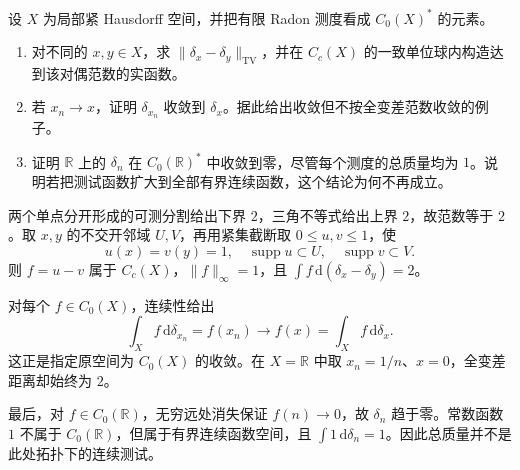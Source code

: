 \begin{exercise}\label{b1:ex:11-dirac-topologies}
设 \(X\) 为局部紧 Hausdorff 空间，并把有限 Radon 测度看成 \(C_0(X)^*\) 的元素。
\begin{enumerate}
\item\label{b1:item:11-dirac-tv}
对不同的 \(x,y\in X\)，求 \(\|\delta_x-\delta_y\|_{\mathrm{TV}}\)，并在 \(C_c(X)\) 的一致单位球内构造达到该对偶范数的实函数。
\item\label{b1:item:11-dirac-limit}
若 \(x_n\rightarrow x\)，证明 \(\delta_{x_n}\) \WeakStar{}收敛到 \(\delta_x\)。据此给出\WeakStar{}收敛但不按全变差范数收敛的例子。
\item\label{b1:item:11-dirac-escape}
证明 \(\mathbb R\) 上的 \(\delta_n\) 在 \(C_0(\mathbb R)^*\) 中\WeakStar{}收敛到零，尽管每个测度的总质量均为 \(1\)。说明若把测试函数扩大到全部有界连续函数，这个结论为何不再成立。
\end{enumerate}
\end{exercise}
\begin{solution}
两个单点分开形成的可测分割给出下界 \(2\)，三角不等式给出上界 \(2\)，故范数等于 \(2\)。取 \(x,y\) 的不交开邻域 \(U,V\)，再用紧集截断取 \(0\le u,v\le1\)，使
\[
 u(x)=v(y)=1,\quad \operatorname{supp}u\subset U,
 \quad \operatorname{supp}v\subset V.
\]
则 \(f=u-v\) 属于 \(C_c(X)\)，\(\|f\|_\infty=1\)，且 \(\int f\,\mathrm d(\delta_x-\delta_y)=2\)。

对每个 \(f\in C_0(X)\)，连续性给出
\[
 \int_Xf\,\mathrm d\delta_{x_n}=f(x_n)\longrightarrow f(x)
 =\int_Xf\,\mathrm d\delta_x.
\]
这正是指定原空间为 \(C_0(X)\) 的\WeakStar{}收敛。在 \(X=\mathbb R\) 中取 \(x_n=1/n\)、\(x=0\)，全变差距离却始终为 \(2\)。

最后，对 \(f\in C_0(\mathbb R)\)，无穷远处消失保证 \(f(n)\rightarrow0\)，故 \(\delta_n\) \WeakStar{}趋于零。常数函数 \(1\) 不属于 \(C_0(\mathbb R)\)，但属于有界连续函数空间，且 \(\int1\,\mathrm d\delta_n=1\)。因此总质量并不是此处\WeakStar{}拓扑下的连续测试。
\end{solution}

